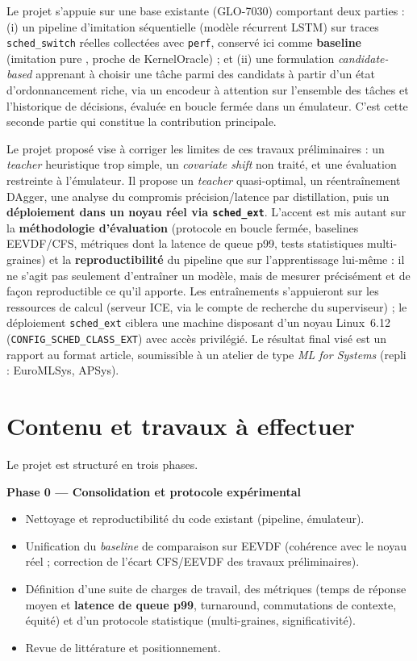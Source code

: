 \documentclass[11pt,a4paper]{article}
\begin{document}
\medskip
Le projet s'appuie sur une base existante (GLO-7030) comportant deux parties :
(i) un pipeline d'imitation séquentielle (modèle récurrent LSTM) sur traces
\texttt{sched\_switch} réelles collectées avec \texttt{perf}, conservé ici comme
\textbf{baseline} (\og imitation pure \fg{}, proche de KernelOracle) ; et (ii) une
formulation \emph{candidate-based} apprenant à choisir une tâche parmi des
candidats à partir d'un état d'ordonnancement riche, via un encodeur à
attention sur l'ensemble des tâches et l'historique de décisions, évaluée en
boucle fermée dans un émulateur. C'est cette seconde partie qui constitue la contribution
principale.

\medskip
Le projet proposé vise à corriger les limites de ces travaux préliminaires : un
\emph{teacher} heuristique trop simple, un \emph{covariate shift} non traité, et une
évaluation restreinte à l'émulateur. Il propose un \emph{teacher} quasi-optimal,
un réentraînement DAgger, une analyse du compromis précision/latence par
distillation, puis un \textbf{déploiement dans un noyau réel via
\texttt{sched\_ext}}. L'accent est mis autant sur la \textbf{méthodologie
d'évaluation} (protocole en boucle fermée, baselines EEVDF/CFS, métriques dont la
latence de queue p99, tests statistiques multi-graines) et la
\textbf{reproductibilité} du pipeline que sur l'apprentissage lui-même :
il ne s'agit pas seulement d'entraîner un modèle, mais de mesurer
précisément et de façon reproductible ce qu'il apporte. Les entraînements
s'appuieront sur les ressources de calcul
(serveur ICE, via le compte de recherche du superviseur) ; le déploiement
\texttt{sched\_ext} ciblera une machine disposant d'un noyau Linux~6.12
(\texttt{CONFIG\_SCHED\_CLASS\_EXT}) avec accès privilégié. Le résultat final
visé est un rapport au format article, soumissible à un atelier de type
\emph{ML for Systems} (repli : EuroMLSys, APSys).

\section{Contenu et travaux à effectuer}
Le projet est structuré en trois phases.

\medskip
\noindent\textbf{Phase 0 — Consolidation et protocole expérimental}
\begin{itemize}[leftmargin=1.5em,itemsep=2pt]
  \item Nettoyage et reproductibilité du code existant (pipeline, émulateur).
  \item Unification du \emph{baseline} de comparaison sur EEVDF (cohérence avec
    le noyau réel ; correction de l'écart CFS/EEVDF des travaux préliminaires).
  \item Définition d'une suite de charges de travail, des métriques (temps de
    réponse moyen et \textbf{latence de queue p99}, turnaround, commutations de
    contexte, équité) et d'un protocole statistique (multi-graines,
    significativité).
  \item Revue de littérature et positionnement.
\end{itemize}
\end{document}
